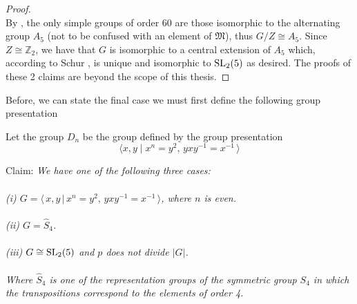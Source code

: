 \begin{proof}
\\
By \cite[p.145]{dummit}, the only simple groups of order 60 are those isomorphic to the alternating group $A_5$ (not to be confused with an element of $\mathfrak{M}$), thus $G / Z \cong A_5$. Since $Z \cong \mathbb{Z}_2$, we have that $G$ is isomorphic to a central extension of $A_5$ which, according to Schur \cite{schur}, is unique and isomorphic to $\operatorname{SL}_2(5)$ as desired. The proofs of these 2 claims are beyond the scope of this thesis. \qedhere

\end{proof}


Before, we can state the final case we must first define the following group presentation

\begin{definition}
    Let the group $D_n$ be the group defined by the group presentation
    \[
    \langle x,y \; | \; x^n = y^2, \, yxy^{-1} = x^{-1} \, \rangle
    \]
\end{definition}


\begin{theorem}[Case VI]
\label{case_VI}
\leanok
Claim: \textit{We have one of the following three cases: \\
\\
(i) $G = \langle \, x,y \, | \, x^n = y^2, \, yxy^{-1} = x^{-1} \, \rangle$, where $n$ is even. \\
\\
(ii) $G = \widehat{S}_4$. \\
\\
(iii) $G \cong \operatorname{SL}_2(5)$ and $p$ does not divide $|G|$. \\
\\
Where $\widehat{S}_4$ is one of the representation groups of the symmetric group $S_4$ in which the transpositions correspond to the elements of order 4.} \\
\end{theorem}

